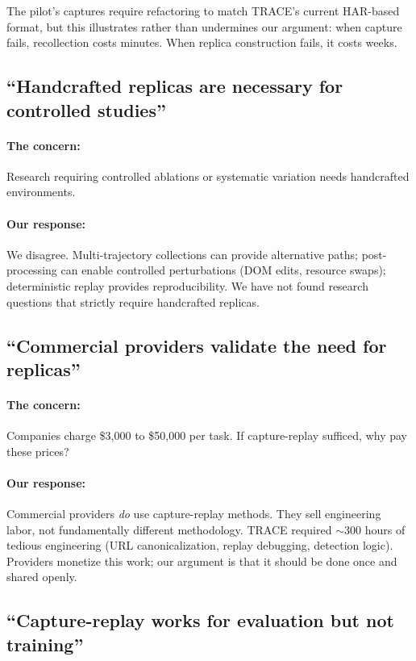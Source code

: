 \documentclass[letterpaper]{article}
\begin{document}
The pilot's captures require refactoring to match TRACE's current HAR-based format, but this illustrates rather than undermines our argument: when capture fails, recollection costs minutes. When replica construction fails, it costs weeks.

\subsection{``Handcrafted replicas are necessary for controlled studies''}

\paragraph{The concern:} Research requiring controlled ablations or systematic variation needs handcrafted environments.

\paragraph{Our response:} We disagree. Multi-trajectory collections can provide alternative paths; post-processing can enable controlled perturbations (DOM edits, resource swaps); deterministic replay provides reproducibility. We have not found research questions that strictly require handcrafted replicas.

\subsection{``Commercial providers validate the need for replicas''}

\paragraph{The concern:} Companies charge \$3,000 to \$50,000 per task. If capture-replay sufficed, why pay these prices?

\paragraph{Our response:} Commercial providers \emph{do} use capture-replay methods. They sell engineering labor, not fundamentally different methodology. TRACE required $\sim$300 hours of tedious engineering (URL canonicalization, replay debugging, detection logic). Providers monetize this work; our argument is that it should be done once and shared openly.

\subsection{``Capture-replay works for evaluation but not training''}
\end{document}
